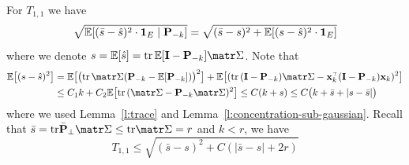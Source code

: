 \documentclass[../../thesis.tex]{subfiles}
\begin{document}
For $T_{1,1}$ we have
\[
  \sqrt{ \mathbb E [(\bar s-\hat s)^2 \cdot\mathbf 1_E \mid\mathbf P_{-k}] } = \sqrt{ (\bar s - s)^2 + \mathbb E[(s - \hat s)^2 \cdot\mathbf 1_E] }
\]
where we denote $s=\E[\hat s]=\tr\,\E[\I - \P_{-k}]\Sigmab$. Note that
\begin{align*}
  \E\big[(s - \hat s)^2 \big] & =
  \E\big[\big(\tr\,\Sigmab(\P_{-k} - \E[\P_{-k}])\big)^2  \big] +
  \E\big[(\tr\,(\I - \P_{-k})\Sigmab-\x_k^\top(\I - \P_{-k})\x_k)^2  \big]                                                                         \\
                              & \leq C_1 k +  C_2 \E\big[\tr\,(\Sigmab - \P_{-k}\Sigmab)^2 \big] \le C(k+s)\leq C\big(k+\bar s + |s- \bar s| \big)
\end{align*}
where we used Lemma~\ref{l:trace} and Lemma~\ref{l:concentration-sub-gaussian}. Recall that $\bar s = \tr \bar \P_\perp \Sigmab \le \tr \Sigmab = r$ and $k < r$, we have
\begin{equation}\label{eq:bound-T11}
  T_{1,1} \le \sqrt{ (\bar s - s)^2 + C (|\bar s - s| + 2 r) }
\end{equation}

\end{document}

